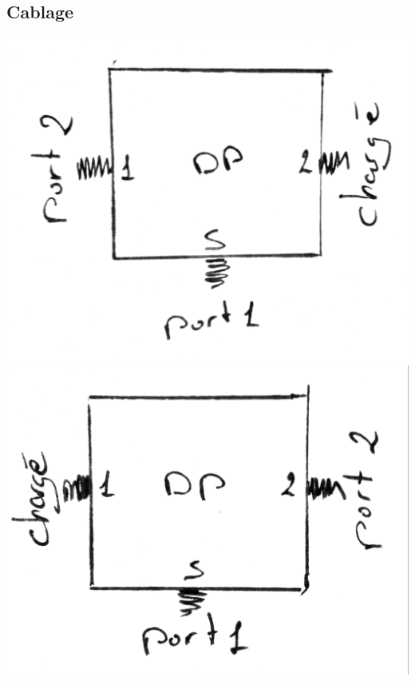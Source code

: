\documentclass[a4paper,12pt]{report}            %
\begin{document}
\subsection{Cablage}
\begin{center}
	\includegraphics[scale = 0.15]{pic/DPS1.png}
	\includegraphics[scale = 0.15]{pic/DPS2.png}
\end{center}
\end{document}
